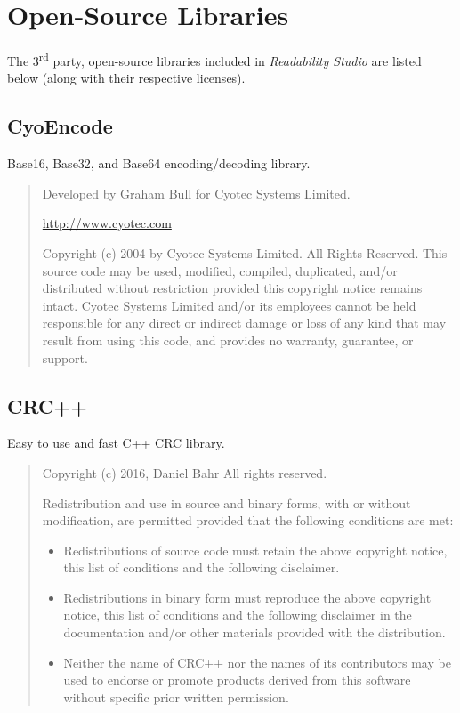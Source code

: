 \documentclass[
]{book}
\theoremstyle{definition}
\theoremstyle{definition}
\theoremstyle{definition}
\theoremstyle{definition}
\theoremstyle{remark}
\begin{document}
\hypertarget{open-source-libraries}{%
\section{Open-Source Libraries}\label{open-source-libraries}}

The 3\textsuperscript{rd} party, open-source libraries included in \emph{Readability Studio} are listed below (along with their respective licenses).

\hypertarget{cyoencode}{%
\subsection*{CyoEncode}\label{cyoencode}}

Base16, Base32, and Base64 encoding/decoding library.

\begin{quote}
Developed by Graham Bull for Cyotec Systems Limited.

\url{http://www.cyotec.com}

Copyright (c) 2004 by Cyotec Systems Limited. All Rights Reserved.
This source code may be used, modified, compiled, duplicated, and/or
distributed without restriction provided this copyright notice remains intact.
Cyotec Systems Limited and/or its employees cannot be held responsible for any
direct or indirect damage or loss of any kind that may result from using this
code, and provides no warranty, guarantee, or support.
\end{quote}

\hypertarget{crc}{%
\subsection*{CRC++}\label{crc}}

Easy to use and fast C++ CRC library.

\begin{quote}
Copyright (c) 2016, Daniel Bahr
All rights reserved.

Redistribution and use in source and binary forms, with or without
modification, are permitted provided that the following conditions are met:

\begin{itemize}
\item
  Redistributions of source code must retain the above copyright notice, this
  list of conditions and the following disclaimer.
\item
  Redistributions in binary form must reproduce the above copyright notice,
  this list of conditions and the following disclaimer in the documentation
  and/or other materials provided with the distribution.
\item
  Neither the name of CRC++ nor the names of its
  contributors may be used to endorse or promote products derived from
  this software without specific prior written permission.
\end{itemize}
\end{quote}
\end{document}
